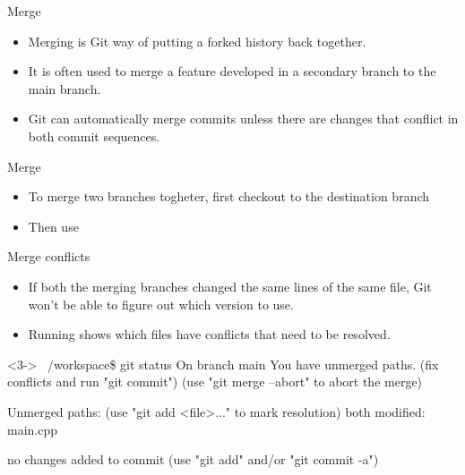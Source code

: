\begin{frame}[fragile]{Merge}
\begin{itemize}[<+->]
    \item Merging is Git way of putting a forked history back together.
    \item It is often used to merge a feature developed in a secondary branch to the main branch.
    \item Git can automatically merge commits unless there are changes that conflict in both commit sequences.
\end{itemize}
\end{frame}

\begin{frame}[fragile]{Merge \insertcontinuationtext}
    \begin{itemize}[<+->]
        \item To merge two branches togheter, first checkout to the destination branch
        \item Then use 
    \end{itemize}
\end{frame}

\begin{frame}[fragile]{Merge conflicts}
    \begin{itemize}[<+->]
        \item If both the merging branches changed the same lines of the same file, Git won't be able to figure out which version to use.
        \item Running  shows which files have conflicts that need to be resolved.
    \end{itemize}
    \begin{shellblock}<3->
~/workspace\$ git status \inserthitenter
On branch main
You have unmerged paths.
  (fix conflicts and run "git commit")
  (use "git merge --abort" to abort the merge)

Unmerged paths:
  (use "git add <file>..." to mark resolution)
        both modified:   main.cpp

no changes added to commit (use "git add" and/or "git commit -a")    
    \end{shellblock}
\end{frame}

